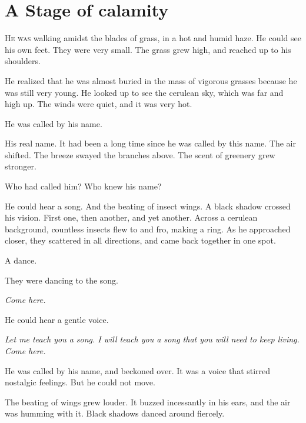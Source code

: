 
\chapter{A Stage of calamity}


\lettrine{H}{e was} walking amidst the blades of grass, in a hot and humid haze. He
could see his own feet. They were very small. The grass grew high, and
reached up to his shoulders.

He realized that he was almost buried in the mass of vigorous grasses
because he was still very young. He looked up to see the cerulean sky,
which was far and high up. The winds were quiet, and it was very hot.

He was called by his name.

His real name. It had been a long time since he was called by this name.
The air shifted. The breeze swayed the branches above. The scent of
greenery grew stronger.

Who had called him? Who knew his name?

He could hear a song. And the beating of insect wings. A black shadow
crossed his vision. First one, then another, and yet another. Across a
cerulean background, countless insects flew to and fro, making a ring.
As he approached closer, they scattered in all directions, and came back
together in one spot.

A dance.

They were dancing to the song.

\emph{Come here.}

He could hear a gentle voice.

\emph{Let me teach you a song. I will teach you a song that you will need to
keep living. Come here.}

He was called by his name, and beckoned over. It was a voice that
stirred nostalgic feelings. But he could not move.

The beating of wings grew louder. It buzzed incessantly in his ears, and
the air was humming with it. Black shadows danced around fiercely.


